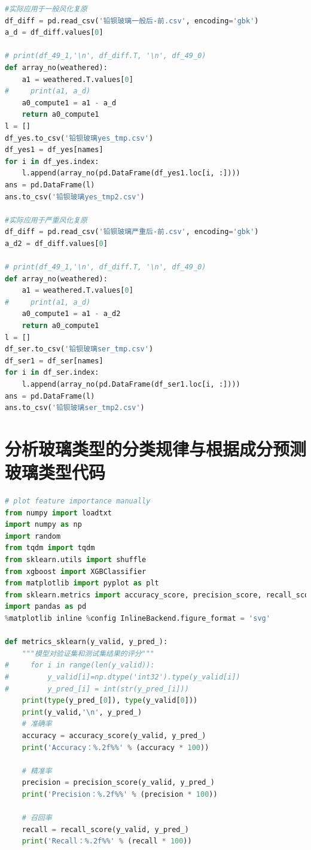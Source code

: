 \documentclass[withoutpreface,bwprint]{cumcmthesis} %
\begin{document}
\begin{appendices}
\begin{lstlisting}[language=Python]
#实际应用于一般风化复原
df_diff = pd.read_csv('铅钡玻璃一般后-前.csv', encoding='gbk')
a_d = df_diff.values[0]

# print(df_49_1,'\n', df_diff.T, '\n', df_49_0)
def array_no(weathered):
    a1 = weathered.T.values[0]
#     print(a1, a_d)
    a0_compute1 = a1 - a_d
    return a0_compute1
l = []
df_yes.to_csv('铅钡玻璃yes_tmp.csv')
df_yes1 = df_yes[names]
for i in df_yes.index:
    l.append(array_no(pd.DataFrame(df_yes1.loc[i, :])))
ans = pd.DataFrame(l)
ans.to_csv('铅钡玻璃yes_tmp2.csv')

#实际应用于严重风化复原
df_diff = pd.read_csv('铅钡玻璃严重后-前.csv', encoding='gbk')
a_d2 = df_diff.values[0]

# print(df_49_1,'\n', df_diff.T, '\n', df_49_0)
def array_no(weathered):
    a1 = weathered.T.values[0]
#     print(a1, a_d)
    a0_compute1 = a1 - a_d2
    return a0_compute1
l = []
df_ser.to_csv('铅钡玻璃ser_tmp.csv')
df_ser1 = df_ser[names]
for i in df_ser.index:
    l.append(array_no(pd.DataFrame(df_ser1.loc[i, :])))
ans = pd.DataFrame(l)
ans.to_csv('铅钡玻璃ser_tmp2.csv')
\end{lstlisting}

\section{分析玻璃类型的分类规律与根据成分预测玻璃类型代码}
\begin{lstlisting}[language=Python]
# plot feature importance manually
from numpy import loadtxt
import numpy as np
import random
from tqdm import tqdm
from sklearn.utils import shuffle
from xgboost import XGBClassifier
from matplotlib import pyplot as plt
from sklearn.metrics import accuracy_score, precision_score, recall_score, roc_auc_score, f1_score, roc_curve
import pandas as pd
%matplotlib inline %config InlineBackend.figure_format = 'svg'

def metrics_sklearn(y_valid, y_pred_):
    """模型对验证集和测试集结果的评分"""
#     for i in range(len(y_valid)):
#         y_valid[i]=np.dtype('int32').type(y_valid[i])
#         y_pred_[i] = int(str(y_pred_[i]))
    print(type(y_pred_[0]), type(y_valid[0]))
    print(y_valid,'\n', y_pred_)
    # 准确率
    accuracy = accuracy_score(y_valid, y_pred_)
    print('Accuracy：%.2f%%' % (accuracy * 100))

    # 精准率
    precision = precision_score(y_valid, y_pred_)
    print('Precision：%.2f%%' % (precision * 100))

    # 召回率
    recall = recall_score(y_valid, y_pred_)
    print('Recall：%.2f%%' % (recall * 100))


\end{lstlisting}
\end{appendices}
\end{document}
